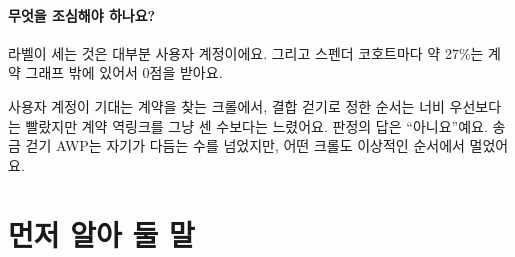 \documentclass[11pt]{article}
\begin{document}
\paragraph{무엇을 조심해야 하나요?}
라벨이 세는 것은 대부분 사용자 계정이에요. 그리고 스펜더 코호트마다 약 27\%는 계약 그래프 밖에 있어서 0점을 받아요.

\begin{puri}
사용자 계정이 기대는 계약을 찾는 크롤에서, 결합 걷기로 정한 순서는 너비 우선보다는 빨랐지만 계약 역링크를 그냥 센 수보다는 느렸어요. 판정의 답은 “아니요”예요. 송금 걷기 AWP는 자기가 다듬는 수를 넘었지만, 어떤 크롤도 이상적인 순서에서 멀었어요.
\end{puri}

\section*{먼저 알아 둘 말}
\end{document}
